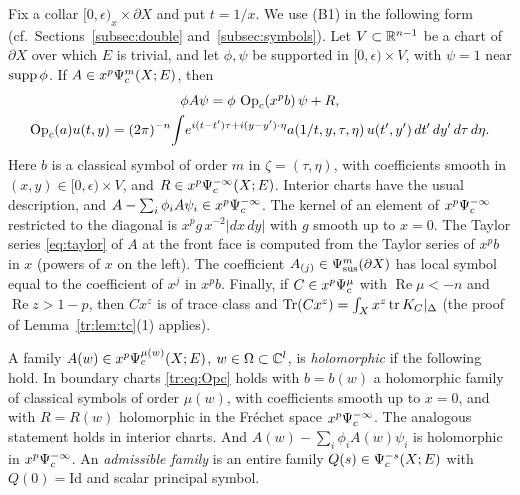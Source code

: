 Fix a collar \([0,\epsilon)_x\times\partial X\) and put \(t=1/x\). We use
(B1) in the following form (cf.\ Sections~\ref{subsec:double}
and~\ref{subsec:symbols}). Let \(V\subset\mathbb R^{n-1}\) be a chart of
\(\partial X\) over which \(E\) is trivial, and let \(\phi,\psi\) be
supported in \([0,\epsilon)\times V\), with \(\psi=1\) near \(\operatorname{supp}\phi\). If
\(A\in x^p\Psi_{c}^m(X;E)\), then
\begin{equation}\label{tr:eq:Opc}
\begin{gathered}
 \phi A\psi=\phi\,\operatorname{Op}_c(x^pb)\,\psi+R,\\
 \operatorname{Op}_c(a)u(t,y)=(2\pi)^{-n}\!\int\! e^{i(t-t')\tau+i(y-y')\cdot\eta}
 a(1/t,y,\tau,\eta)\,u(t',y')\,dt'\,dy'\,d\tau\,d\eta .
\end{gathered}
\end{equation}
Here \(b\) is a classical symbol of order \(m\) in \(\zeta=(\tau,\eta)\), with
coefficients smooth in \((x,y)\in[0,\epsilon)\times V\), and
\(R\in x^p\Psi_{c}^{-\infty}(X;E)\). Interior charts have the usual
description, and \(A-\sum_i\phi_iA\psi_i\in x^p\Psi_{c}^{-\infty}\). The kernel
of an element of \(x^p\Psi_{c}^{-\infty}\) restricted to the diagonal is \(x^p g\,
x^{-2}|dx\,dy|\) with \(g\) smooth up to \(x=0\). The Taylor series
\eqref{eq:taylor} of \(A\) at the front face is computed from the Taylor
series of \(x^pb\) in \(x\) (powers of \(x\) on the left). The coefficient
\(A_{(j)}\in\Psi_{\mathrm{sus}}^m(\partial X)\) has local symbol equal to the coefficient
of \(x^j\) in \(x^pb\). Finally, if \(C\in x^p\Psi_{c}^\mu\) with
\(\operatorname{Re}\mu<-n\) and \(\operatorname{Re}z>1-p\), then \(Cx^z\) is of
trace class and \(\operatorname{Tr}(Cx^z)=\int_Xx^z\operatorname{tr} K_C|_\Delta\) (the proof of
Lemma~\ref{tr:lem:tc}(1) applies).

\begin{definition}\label{tr:def:cuspfam}
A family \(A(w)\in x^p\Psi_{c}^{\mu(w)}(X;E)\), \(w\in\Omega\subset\mathbb C^l\), is
\emph{holomorphic} if the following hold. In boundary charts
\eqref{tr:eq:Opc} holds with \(b=b(w)\) a holomorphic family of classical
symbols of order \(\mu(w)\), with coefficients smooth up to \(x=0\), and
with \(R=R(w)\) holomorphic in the Fr\'echet space \(x^p\Psi_{c}^{-\infty}\). The
analogous statement holds in interior charts. And \(A(w)-\sum_i\phi_iA(w)
\psi_i\) is holomorphic in \(x^p\Psi_{c}^{-\infty}\). An \emph{admissible
family} is an entire family \(Q(s)\in\Psi_{c}^{-s}(X;E)\) with
\(Q(0)=\mathrm{Id}\) and scalar principal symbol.
\end{definition}


